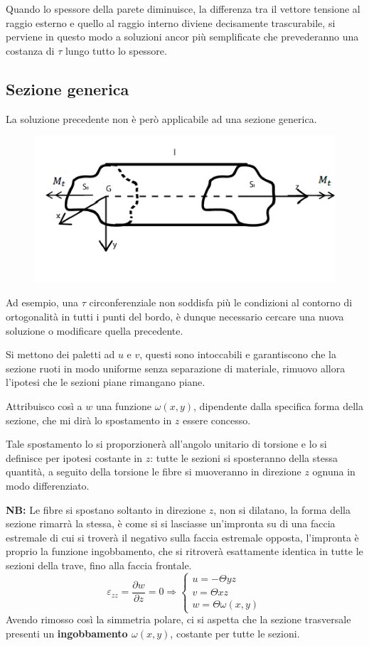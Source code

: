 			Quando lo spessore della parete diminuisce, la differenza tra il vettore tensione al raggio esterno e quello al raggio interno diviene decisamente trascurabile, si perviene in questo modo a soluzioni ancor più semplificate che prevederanno una costanza di $\tau$ lungo tutto lo spessore. \newpage

\subsection{Sezione generica}
		La soluzione precedente non è però applicabile ad una sezione generica. 
\begin{figure}[H]
	\centering
	\label{fig:screenshot003}
	\includegraphics[width=0.5\linewidth]{immagini_5/screenshot003}
\end{figure}
		Ad esempio, una $\tau$ circonferenziale non soddisfa più le condizioni al contorno di ortogonalità in tutti i punti del bordo, è dunque necessario cercare una nuova soluzione o modificare quella precedente.
		
		Si mettono dei paletti ad $u$ e $v$, questi sono intoccabili e garantiscono che la sezione ruoti in modo uniforme senza separazione di materiale, rimuovo allora l'ipotesi che le sezioni piane rimangano piane. 
		
		Attribuisco così a $w$ una funzione $\omega(x,y)$, dipendente dalla specifica forma della sezione, che mi dirà lo spostamento in $z$ essere concesso. 
		
		Tale spostamento lo si proporzionerà all'angolo unitario di torsione e lo si definisce per ipotesi costante in $z$: tutte le sezioni si sposteranno della stessa quantità, a seguito della torsione le fibre si muoveranno in direzione $z$ ognuna in modo differenziato.
		
		\textbf{NB:} Le fibre si spostano soltanto in direzione $z$, non si dilatano, la forma della sezione rimarrà la stessa, è come si si lasciasse un'impronta su di una faccia estremale di cui si troverà il negativo sulla faccia estremale opposta, l'impronta è proprio la funzione ingobbamento, che si ritroverà esattamente identica in tutte le sezioni della trave, fino alla faccia frontale.  		
		\[ \varepsilon_{zz} = \dfrac{\partial w}{\partial z} = 0 \Rightarrow \begin{cases}
			u = -\Theta yz  \\
			v =  \Theta xz  \\
			w = \Theta \omega(x,y)
		\end{cases} \]
		Avendo rimosso così la simmetria polare, ci si aspetta
		che la sezione trasversale presenti un \textbf{ingobbamento $\omega(x,y)$},
		costante per tutte le sezioni.\newline 
		
